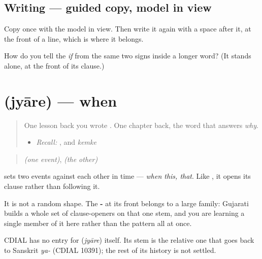 \subsection*{Writing — guided copy, model in view}
Copy \textbf{} once with the model in view. Then write it again with a space after it, at the front of a line, which is where it belongs.

\begin{tcolorbox}[breakable,colback=teal!4,colframe=teal!35!black,title={Before you move on}]
How do you tell the \emph{if} \textbf{} from the same two signs inside a longer word? (It stands alone, at the front of its clause.)
\end{tcolorbox}
\section[\texorpdfstring{\gu{જ્યારે} (jyāre)}{જ્યારે (jyāre)}]{ (jyāre) — when}

\label{lesson:GU-C35-jyaare}



\begin{quote}
One lesson back you wrote \textbf{}. One chapter back, the word that answers \emph{why}.

\begin{itemize}
\raggedright
  \item \emph{Recall:} \textbf{}, and \emph{kemke}
\end{itemize}
\end{quote}

\begin{cousinweb}
\begin{quote}
\textbf{} \emph{(one event)}, \emph{(the other)}
\end{quote}

\textbf{} sets two events against each other in time — \emph{when this, that}. Like \textbf{}, it opens its clause rather than following it.

It is not a random shape. The \textbf{-} at its front belongs to a large family: Gujarati builds a whole set of clause-openers on that one stem, and you are learning a single member of it here rather than the pattern all at once.

CDIAL has no entry for \textbf{} (\emph{jyāre}) itself. Its stem is the relative one that goes back to Sanskrit \emph{ya-} (CDIAL 10391); the rest of its history is not settled.
\end{cousinweb}

